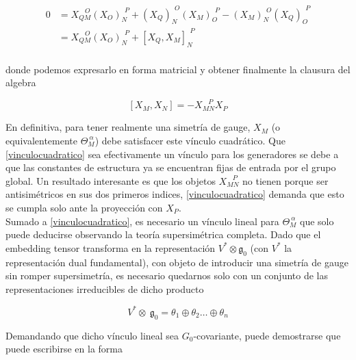 \documentclass{article}
\numberwithin{equation}{section}
\begin{document}
\begin{equation}\label{embedding2}
\begin{aligned}
0 &= X_{Q M}^{\ \ \ \ O} \left(X_O\right)_N^{ \ \ P} + \left(X_Q\right)_N^{\ \ O} \left( X_M\right)_O^{\ \ P} - \left(X_M\right)_N^{\ \ O} \left(X_Q\right)_O^{\ \ P} \\
&= X_{Q M}^{\ \ \ \ O} \left(X_O\right)_N^{ \ \ P} + \left[X_Q,X_M\right]_N^{\ \ P} \\
\end{aligned}
\end{equation}

donde podemos expresarlo en forma matricial y obtener finalmente la clausura del algebra\\

\begin{boxquation}
\begin{equation}\label{vinculocuadratico}
\left[X_M, X_N\right] = - X_{M N}^{\ \ \ \ P} X_P
\end{equation}
\end{boxquation}


En definitiva, para tener realmente una simetría de gauge, $ X_M $ (o equivalentemente $ \Theta_M^{\ \alpha} $) debe satisfacer este vínculo cuadrático. Que \ref{vinculocuadratico} sea efectivamente un vínculo para los generadores se debe a que las constantes de estructura ya se encuentran fijas de entrada por el grupo global. Un resultado interesante es que los objetos $ X_{M N}^{\ \ \ \ P} $ no tienen porque ser antisimétricos en sus dos primeros indices, \ref{vinculocuadratico} demanda que esto se cumpla solo ante la proyección con $ X_P $.\\

Sumado a \ref{vinculocuadratico}, es necesario un vínculo lineal para $ \Theta_M^{\ \alpha} $ que solo puede deducirse observando la teoría supersimétrica completa. Dado que el embedding tensor transforma en la representación $ V^{*} \otimes \mathfrak{g}_0 $  (con $ V^{*} $ la representación dual fundamental), con objeto de introducir una simetría de gauge sin romper supersimetría, es necesario quedarnos solo con un conjunto de las representaciones irreducibles de dicho producto

\begin{equation}
V^{*} \otimes \ \mathfrak{g}_0 = \theta_1 \oplus \theta_2 \dots \oplus \theta_n
\end{equation}

Demandando que dicho vínculo lineal sea $G_0$-covariante, puede demostrarse que puede escribirse en la forma
\end{document}
